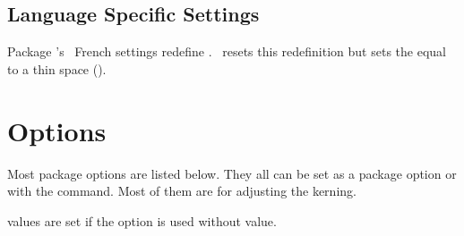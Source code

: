 \documentclass[load-preamble+]{cnltx-doc}
\begin{document}
\subsection{Language Specific Settings}
Package 's~\cite{pkg:babel} French settings redefine
.  \fnpct\ resets this redefinition but sets the
 equal to a thin space (\code{.16667em}).

\section{Options}\label{sec:options}
Most package options are listed below.  They all can be set as a package
option or with the  command.  Most of them are for adjusting the
kerning.

 values are set if the option is used without value.
\end{document}
